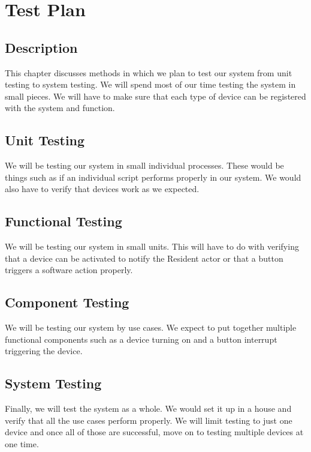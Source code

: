 \chapter{Test Plan}

\section{Description}
This chapter discusses methods in which we plan to test our system from unit testing to system testing. We will spend most of our time testing the system in small pieces. We will have to make sure that each type of device can be registered with the system and function.

\section{Unit Testing}
We will be testing our system in small individual processes. These would be things such as if an individual script performs properly in our system. We would also have to verify that devices work as we expected.

\section{Functional Testing}
We will be testing our system in small units. This will have to do with verifying that a device can be activated to notify the Resident actor or that a button triggers a software action properly.

\section{Component Testing}
We will be testing our system by use cases. We expect to put together multiple functional components such as a device turning on and a button interrupt triggering the device.

\section{System Testing}
Finally, we will test the system as a whole. We would set it up in a house and verify that all the use cases perform properly. We will limit testing to just one device and once all of those are successful, move on to testing multiple devices at one time.